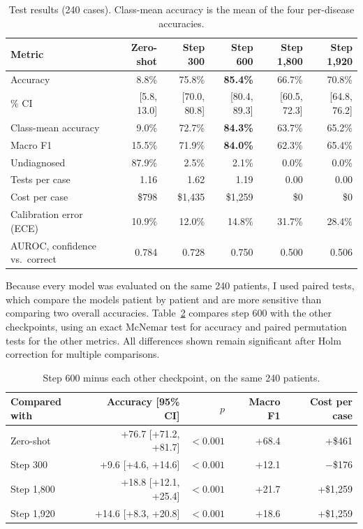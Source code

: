 \documentclass[11pt]{article}
\begin{document}
\begin{table}[ht]
  \centering
  \caption{Test results (240 cases). Class-mean accuracy is the mean of the
  four per-disease accuracies.}
  \label{tab:test}
  \small
  \begin{tabular}{lrrrrr}
    \toprule
    Metric & Zero-shot & Step 300 & Step 600 & Step 1,800 & Step 1,920 \\
    \midrule
    Accuracy & 8.8\% & 75.8\% & \textbf{85.4\%} & 66.7\% & 70.8\% \\
    \quad 95\% CI & [5.8, 13.0] & [70.0, 80.8] & [80.4, 89.3] & [60.5, 72.3] & [64.8, 76.2] \\
    Class-mean accuracy & 9.0\% & 72.7\% & \textbf{84.3\%} & 63.7\% & 65.2\% \\
    Macro F1 & 15.5\% & 71.9\% & \textbf{84.0\%} & 62.3\% & 65.4\% \\
    Undiagnosed & 87.9\% & 2.5\% & 2.1\% & 0.0\% & 0.0\% \\
    Tests per case & 1.16 & 1.62 & 1.19 & 0.00 & 0.00 \\
    Cost per case & \$798 & \$1,435 & \$1,259 & \$0 & \$0 \\
    Calibration error (ECE) & 10.9\% & 12.0\% & 14.8\% & 31.7\% & 28.4\% \\
    AUROC, confidence vs.\ correct & 0.784 & 0.728 & 0.750 & 0.500 & 0.506 \\
    \bottomrule
  \end{tabular}
\end{table}

Because every model was evaluated on the same 240 patients, I used paired
tests, which compare the models patient by patient and are more sensitive than
comparing two overall accuracies. Table~\ref{tab:paired} compares step 600
with the other checkpoints, using an exact McNemar test for accuracy and paired
permutation tests for the other metrics. All differences shown remain
significant after Holm correction for multiple comparisons.

\begin{table}[ht]
  \centering
  \caption{Step 600 minus each other checkpoint, on the same 240 patients.}
  \label{tab:paired}
  \small
  \begin{tabular}{lrrrr}
    \toprule
    Compared with & Accuracy [95\% CI] & $p$ & Macro F1 & Cost per case \\
    \midrule
    Zero-shot & +76.7 [+71.2, +81.7] & $<0.001$ & +68.4 & +\$461 \\
    Step 300 & +9.6 [+4.6, +14.6] & $<0.001$ & +12.1 & $-$\$176 \\
    Step 1,800 & +18.8 [+12.1, +25.4] & $<0.001$ & +21.7 & +\$1,259 \\
    Step 1,920 & +14.6 [+8.3, +20.8] & $<0.001$ & +18.6 & +\$1,259 \\
    \bottomrule
  \end{tabular}
\end{table}
\end{document}
